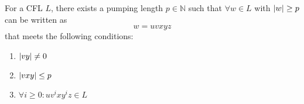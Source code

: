 \documentclass{imgs}
\begin{document}
\begin{theorem}
  For a CFL $L$, there exists a pumping length $p \in \mathbb{N}$
  such that $\forall w \in L$ with $\abs{w} \geq p$ can be written as
  \[
    w = uvxyz
  \]
  that meets the following conditions:
  \begin{enumerate}
    \item $\abs{vy} \neq 0$
    \item $\abs{vxy} \leq p$
    \item $\forall i \geq 0 : uv^ixy^iz \in L$
  \end{enumerate}
\end{theorem}
\end{document}
